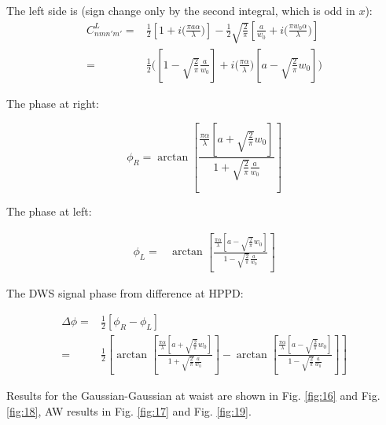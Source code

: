 \documentclass[aps,twoside,secnumarabic,balancelastpage,amsmath,amssymb,nofootinbib,hyperref=pdftex]{revtex4}
\begin{document}
The left side is (sign change only by the second integral, which is odd in $x$):
\begin{align*}
C_{nmn'm'}^{L} = &
	         { \frac{1}{2} }
        \left[
				1+
				i \big( \frac{ \pi a \alpha}{ \lambda} \big)
			\right] 
			-
			\frac{1}{2}
       \sqrt{ \frac{2}{\pi} } 
        	\left[
                \frac{a}{w_{0}}		
                +
                i  \big( \frac{\pi w_{0} \alpha}{\lambda} \big)
			\right] 	
		\\ = &
		\frac{1}{2}	
		\Big(	         
        \left[
				1
				-
				 \sqrt{\frac{2}{\pi}} \frac{a}{w_0}
		\right] 
	+
		i \big( \frac{ \pi \alpha}{\lambda} \big)	
		\left[
			a
			-
        	\sqrt{\frac{2}{\pi}}
        	w_0
		\right] 
		\Big)	
\end{align*}

The phase at right:

\begin{equation*}
	\phi_R = 		
			\arctan
				\left[
					\frac
					{ \frac{\pi \alpha}{\lambda}
					\left[
						a 
						+
						\sqrt{\frac{2}{\pi}} w_0
					\right]}					
				{1
				+
				 \sqrt{\frac{2}{\pi}} \frac{a}{w_0}
				 }
				\right]
\end{equation*}

The phase at left:

\begin{align*}
	\phi_L =&
			\arctan
				\left[
					\frac
					{ \frac{\pi \alpha}{\lambda}
					\left[
						a 
						-
						\sqrt{\frac{2}{\pi}} w_0
					\right]}					
				{1
				-
				 \sqrt{\frac{2}{\pi}} \frac{a}{w_0}
				 }
				\right]
\end{align*}

The DWS signal phase from difference at HPPD:

\begin{align*}
	\Delta \phi = &
		 \frac{1}{2} 
		 \left[
		 	\phi_R - \phi_L
		 \right]
		 \\ = &
		 \frac{1}{2}
		 \left[
							\arctan
				\left[
					\frac
					{ \frac{\pi \alpha}{\lambda}
					\left[
						a 
						+
						\sqrt{\frac{2}{\pi}} w_0
					\right]}					
				{1
				+
				 \sqrt{\frac{2}{\pi}} \frac{a}{w_0}
				 }
				\right]
		-
			\arctan
				\left[
					\frac
					{ \frac{\pi \alpha}{\lambda}
					\left[
						a 
						-
						\sqrt{\frac{2}{\pi}} w_0
					\right]}					
				{1
				-
				 \sqrt{\frac{2}{\pi}} \frac{a}{w_0}
				 }
				\right]	
			\right]							 	
\end{align*}

Results for the Gaussian-Gaussian at waist are shown in Fig. \ref{fig:16} and Fig. \ref{fig:18}, AW results in Fig. \ref{fig:17} and Fig. \ref{fig:19}.
\end{document}
